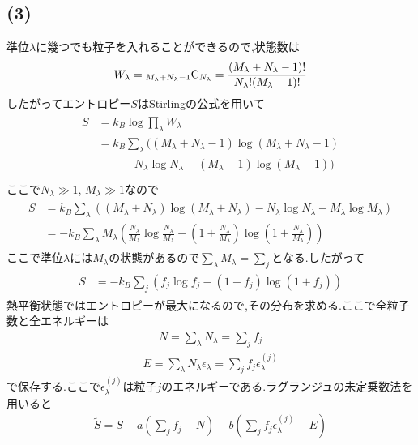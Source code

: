 \subsection*{(3)}
準位$\lambda$に幾つでも粒子を入れることができるので,状態数は
\begin{align}
  W_\lambda={}_{M_\lambda+N_\lambda-1}{\rm C}_{N_\lambda}=\frac{(M_\lambda+N_\lambda-1)!}{N_\lambda!(M_\lambda-1)!}
\end{align}
したがってエントロピー$S$はStirlingの公式を用いて
\begin{align}
  \begin{split}
    S&=k_B\log\prod_\lambda W_\lambda\\
    &=k_B\sum_\lambda((M_\lambda+N_\lambda-1)\log(M_\lambda+N_\lambda-1)\\
    &\qquad-N_\lambda\log N_\lambda-(M_\lambda-1)\log(M_\lambda-1))\\
  \end{split}
\end{align}
ここで$N_\lambda\gg1$, $M_\lambda\gg1$なので
\begin{align}
  \begin{split}
    S&=k_B\sum_\lambda((M_\lambda+N_\lambda)\log(M_\lambda+N_\lambda)-N_\lambda\log N_\lambda-M_\lambda\log M_\lambda)\\
    &=-k_B\sum_\lambda M_\lambda\left(\frac{N_\lambda}{M_\lambda}\log\frac{N_\lambda}{M_\lambda}-\left(1+\frac{N_\lambda}{M_\lambda}\right)\log\left(1+\frac{N_\lambda}{M_\lambda}\right)\right)
  \end{split}
\end{align}
ここで準位$\lambda$には$M_\lambda$の状態があるので$\sum_\lambda M_\lambda=\sum_j$となる.したがって
\begin{align}
  \begin{split}
    S&=-k_B\sum_j\left(f_j\log f_j-(1+f_j)\log(1+f_j)\right)
  \end{split}
\end{align}
熱平衡状態ではエントロピーが最大になるので,その分布を求める.ここで全粒子数と全エネルギーは
\begin{align}
  N=\sum_\lambda N_\lambda=\sum_jf_j
\end{align}
\begin{align}
  E=\sum_\lambda N_\lambda\epsilon_\lambda=\sum_jf_j\epsilon_\lambda^{(j)}
\end{align}
で保存する.ここで$\epsilon_\lambda^{(j)}$は粒子$j$のエネルギーである.ラグランジュの未定乗数法を用いると
\begin{align}
  \tilde{S}=S-a\left(\sum_jf_j-N\right)-b\left(\sum_jf_j\epsilon_\lambda^{(j)}-E\right)
\end{align}
